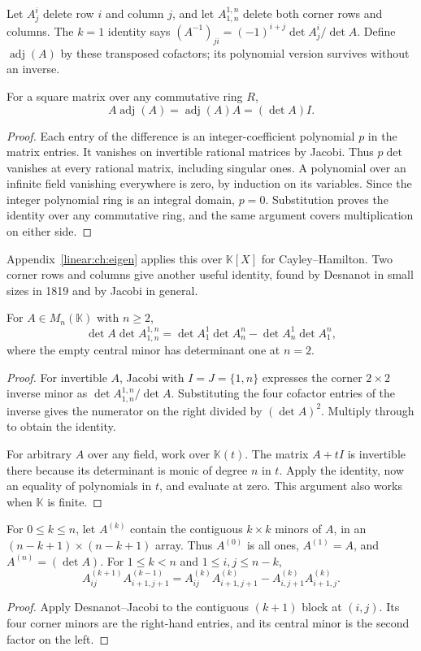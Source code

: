 Let $A^i_j$ delete row $i$ and column $j$, and let $A^{1,n}_{1,n}$ delete both corner rows and columns. The $k=1$ identity says $(A^{-1})_{ji}=(-1)^{i+j}\det A^i_j/\det A$. Define $\operatorname{adj}(A)$ by these transposed cofactors; its polynomial version survives without an inverse.
\begin{corollary}\label{linear:cor:adjugate}
For a square matrix over any commutative ring $R$,
\[A\operatorname{adj}(A)=\operatorname{adj}(A)A=(\det A)I.\]
\end{corollary}
\begin{proof}
Each entry of the difference is an integer-coefficient polynomial $p$ in the matrix entries. It vanishes on invertible rational matrices by Jacobi. Thus $p\det$ vanishes at every rational matrix, including singular ones. A polynomial over an infinite field vanishing everywhere is zero, by induction on its variables. Since the integer polynomial ring is an integral domain, $p=0$. Substitution proves the identity over any commutative ring, and the same argument covers multiplication on either side.
\end{proof}

Appendix~\ref{linear:ch:eigen} applies this over $\mathbb K[X]$ for Cayley--Hamilton. Two corner rows and columns give another useful identity, found by Desnanot in small sizes in 1819 and by Jacobi in general.

\begin{theorem}\label{linear:thm:desnanot}
For $A\in M_n(\mathbb K)$ with $n\ge2$,
\[\det A\det A^{1,n}_{1,n}=\det A^1_1\det A^n_n-\det A^1_n\det A^n_1,\]
where the empty central minor has determinant one at $n=2$.
\end{theorem}
\begin{proof}
For invertible $A$, Jacobi with $I=J=\{1,n\}$ expresses the corner $2\times2$ inverse minor as $\det A^{1,n}_{1,n}/\det A$. Substituting the four cofactor entries of the inverse gives the numerator on the right divided by $(\det A)^2$. Multiply through to obtain the identity.

For arbitrary $A$ over any field, work over $\mathbb K(t)$. The matrix $A+tI$ is invertible there because its determinant is monic of degree $n$ in $t$. Apply the identity, now an equality of polynomials in $t$, and evaluate at zero. This argument also works when $\mathbb K$ is finite.
\end{proof}

\begin{corollary}\label{linear:cor:dodgson}
For $0\le k\le n$, let $A^{(k)}$ contain the contiguous $k\times k$ minors of $A$, in an $(n-k+1)\times(n-k+1)$ array. Thus $A^{(0)}$ is all ones, $A^{(1)}=A$, and $A^{(n)}=(\det A)$. For $1\le k<n$ and $1\le i,j\le n-k$,
\[A^{(k+1)}_{ij}A^{(k-1)}_{i+1,j+1}
 =A^{(k)}_{ij}A^{(k)}_{i+1,j+1}-A^{(k)}_{i,j+1}A^{(k)}_{i+1,j}.\]
\end{corollary}
\begin{proof}
Apply Desnanot--Jacobi to the contiguous $(k+1)$ block at $(i,j)$. Its four corner minors are the right-hand entries, and its central minor is the second factor on the left.
\end{proof}

